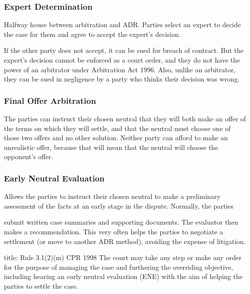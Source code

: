 \documentclass[
]{article}
\newenvironment{Shaded}{}{}
\newcommand{\NormalTok}[1]{#1}
\begin{document}
\hypertarget{expert-determination}{%
\subsubsection{Expert Determination}\label{expert-determination}}

Halfway house between arbitration and ADR. Parties select an expert to
decide the case for them and agree to accept the expert's decision.

If the other party does not accept, it can be sued for breach of
contract. But the expert's decision cannot be enforced as a court order,
and they do not have the power of an arbitrator under Arbitration Act
1996. Also, unlike an arbitrator, they can be sued in negligence by a
party who thinks their decision was wrong.

\hypertarget{final-offer-arbitration}{%
\subsubsection{Final Offer Arbitration}\label{final-offer-arbitration}}

The parties can instruct their chosen neutral that they will both make
an offer of the terms on which they will settle, and that the neutral
must choose one of those two offers and no other solution. Neither party
can afford to make an unrealistic offer, because that will mean that the
neutral will choose the opponent's offer.

\hypertarget{early-neutral-evaluation}{%
\subsubsection{Early Neutral
Evaluation}\label{early-neutral-evaluation}}

Allows the parties to instruct their chosen neutral to make a
preliminary assessment of the facts at an early stage in the dispute.
Normally, the parties

submit written case summaries and supporting documents. The evaluator
then makes a recommendation. This very often helps the parties to
negotiate a settlement (or move to another ADR method), avoiding the
expense of litigation.

\begin{Shaded}
\begin{Highlighting}[]
\NormalTok{title: Rule 3.1(2)(m) CPR 1998}
\NormalTok{The court may take any step or make any order for the purpose of managing the case and furthering the overriding objective, including hearing an early neutral evaluation (ENE) with the aim of helping the parties to settle the case.}
\end{Highlighting}
\end{Shaded}
\end{document}
